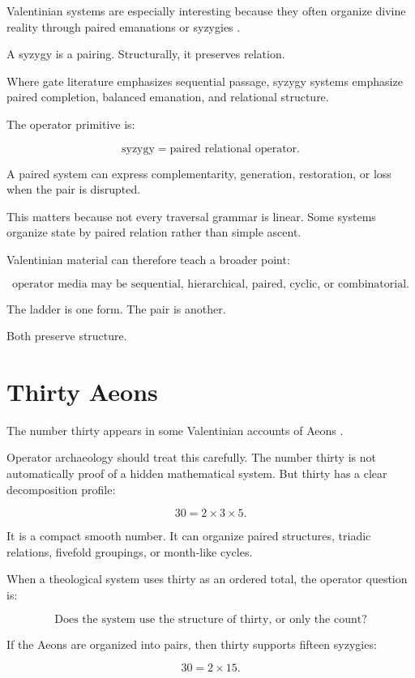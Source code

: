\documentclass[11pt]{book}
\begin{document}
Valentinian systems are especially interesting because they often organize divine reality through paired emanations or syzygies \cite{Jonas1963GnosticReligion,Pagels1979GnosticGospels}.

A syzygy is a pairing. Structurally, it preserves relation.

Where gate literature emphasizes sequential passage, syzygy systems emphasize paired completion, balanced emanation, and relational structure.

The operator primitive is:

\[
\text{syzygy} = \text{paired relational operator}.
\]

A paired system can express complementarity, generation, restoration, or loss when the pair is disrupted.

This matters because not every traversal grammar is linear. Some systems organize state by paired relation rather than simple ascent.

Valentinian material can therefore teach a broader point:

\[
\text{operator media may be sequential, hierarchical, paired, cyclic, or combinatorial}.
\]

The ladder is one form. The pair is another.

Both preserve structure.

\section{Thirty Aeons}

The number thirty appears in some Valentinian accounts of Aeons \cite{Jonas1963GnosticReligion,Pagels1979GnosticGospels}.

Operator archaeology should treat this carefully. The number thirty is not automatically proof of a hidden mathematical system. But thirty has a clear decomposition profile:

\[
30 = 2 \times 3 \times 5.
\]

It is a compact smooth number. It can organize paired structures, triadic relations, fivefold groupings, or month-like cycles.

When a theological system uses thirty as an ordered total, the operator question is:

\[
\text{Does the system use the structure of thirty, or only the count?}
\]

If the Aeons are organized into pairs, then thirty supports fifteen syzygies:

\[
30 = 2 \times 15.
\]
\end{document}
